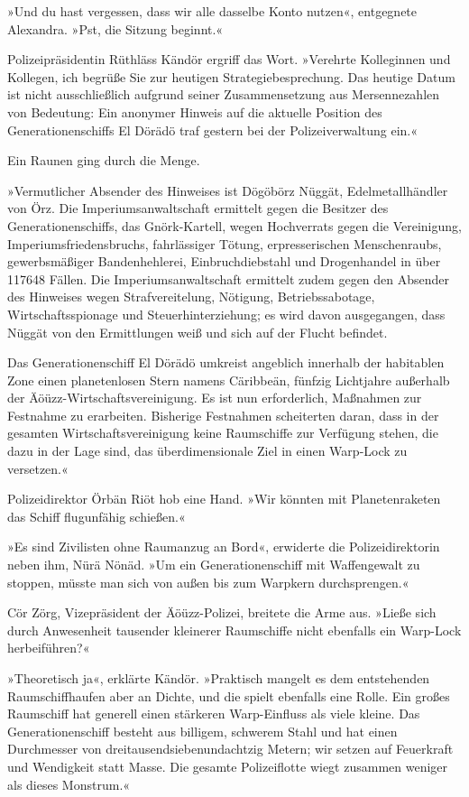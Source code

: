 »Und du hast vergessen, dass wir alle dasselbe Konto nutzen«, entgegnete Alexandra. »Pst, die Sitzung beginnt.«

Polizeipräsidentin Rüthläss Kändör ergriff das Wort. »Verehrte Kolleginnen und Kollegen, ich begrüße Sie zur heutigen Strategiebesprechung. Das heutige Datum ist nicht ausschließlich aufgrund seiner Zusammensetzung aus Mersennezahlen von Bedeutung: Ein anonymer Hinweis auf die aktuelle Position des Generationenschiffs El Dörädö traf gestern bei der Polizeiverwaltung ein.«

Ein Raunen ging durch die Menge.

»Vermutlicher Absender des Hinweises ist Dögöbörz Nüggät, Edelmetallhändler von Örz. Die Imperiumsanwaltschaft ermittelt gegen die Besitzer des Generationenschiffs, das Gnörk-Kartell, wegen Hochverrats gegen die Vereinigung, Imperiumsfriedensbruchs, fahrlässiger Tötung, erpresserischen Menschenraubs, gewerbsmäßiger Bandenhehlerei, Einbruchdiebstahl und Drogenhandel in über 117648 Fällen. Die Imperiumsanwaltschaft ermittelt zudem gegen den Absender des Hinweises wegen Strafvereitelung, Nötigung, Betriebssabotage, Wirtschaftsspionage und Steuerhinterziehung; es wird davon ausgegangen, dass Nüggät von den Ermittlungen weiß und sich auf der Flucht befindet.

Das Generationenschiff El Dörädö umkreist angeblich innerhalb der habitablen Zone einen planetenlosen Stern namens Cäribbeän, fünfzig Lichtjahre außerhalb der Äöüzz-Wirtschaftsvereinigung. Es ist nun erforderlich, Maßnahmen zur Festnahme zu erarbeiten. Bisherige Festnahmen scheiterten daran, dass in der gesamten Wirtschaftsvereinigung keine Raumschiffe zur Verfügung stehen, die dazu in der Lage sind, das überdimensionale Ziel in einen Warp-Lock zu versetzen.«

Polizeidirektor Örbän Riöt hob eine Hand. »Wir könnten mit Planetenraketen das Schiff flugunfähig schießen.«

»Es sind Zivilisten ohne Raumanzug an Bord«, erwiderte die Polizeidirektorin neben ihm, Nürä Nönäd. »Um ein Generationenschiff mit Waffengewalt zu stoppen, müsste man sich von außen bis zum Warpkern durchsprengen.«

Cör Zörg, Vizepräsident der Äöüzz-Polizei, breitete die Arme aus. »Ließe sich durch Anwesenheit tausender kleinerer Raumschiffe nicht ebenfalls ein Warp-Lock herbeiführen?«

»Theoretisch ja«, erklärte Kändör. »Praktisch mangelt es dem entstehenden Raumschiffhaufen aber an Dichte, und die spielt ebenfalls eine Rolle. Ein großes Raumschiff hat generell einen stärkeren Warp-Einfluss als viele kleine. Das Generationenschiff besteht aus billigem, schwerem Stahl und hat einen Durchmesser von dreitausendsiebenundachtzig Metern; wir setzen auf Feuerkraft und Wendigkeit statt Masse. Die gesamte Polizeiflotte wiegt zusammen weniger als dieses Monstrum.«

